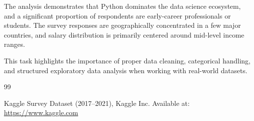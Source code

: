 \documentclass[a4paper,12pt]{report}
\begin{document}
The analysis demonstrates that Python dominates the data science ecosystem, and a significant proportion of respondents are early-career professionals or students. 
The survey responses are geographically concentrated in a few major countries, and salary distribution is primarily centered around mid-level income ranges.

This task highlights the importance of proper data cleaning, categorical handling, and structured exploratory data analysis when working with real-world datasets.

\begin{thebibliography}{99}

 Kaggle Survey Dataset (2017--2021), Kaggle Inc. Available at: \url{https://www.kaggle.com}

\end{thebibliography}
\end{document}
